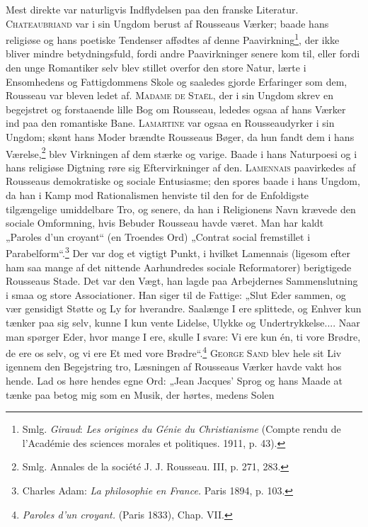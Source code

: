\documentclass[12pt,a4paper,openany]{book}
\newcommand{\opage}[1]{\marginnote{\footnotesize\textit{[#1]}}}
\begin{document}
Mest direkte var naturligvis Indflydelsen paa den franske
Literatur. \textsc{Chateaubriand} var i sin Ungdom berust af Rousseaus
Værker; baade hans religiøse og hans poetiske Tendenser
affødtes af denne Paavirkning\footnote[1]{Smlg. \emph{Giraud}: \textit{Les origines du Génie du Christianisme} (Compte rendu de l’Académie des sciences morales et politiques. 1911, p. 43).}, der ikke bliver mindre betydningsfuld,
fordi andre Paavirkninger senere kom til, eller fordi
den unge Romantiker selv blev stillet overfor den store Natur,
lærte i Ensomhedens og Fattigdommens Skole og saaledes gjorde
Erfaringer som dem, Rousseau var bleven ledet af. \textsc{Madame
de Staël}, der i sin Ungdom skrev en begejstret og forstaaende
lille Bog om Rousseau, lededes ogsaa af hans Værker ind paa
den romantiske Bane. \textsc{Lamartine} var ogsaa en Rousseaudyrker
i sin Ungdom; skønt hans Moder brændte Rousseaus Bøger, da
hun fandt dem i hans Værelse,\footnote[2]{Smlg. Annales de la société J. J. Rousseau. III, p. 271, 283.} blev Virkningen af dem stærke
og varige. Baade i hans Naturpoesi og i hans religiøse Digtning
røre sig Eftervirkninger af den. \textsc{Lamennais} paavirkedes af
Rousseaus demokratiske og sociale Entusiasme; den spores baade
i hans Ungdom, da han i Kamp mod Rationalismen henviste til
den for de Enfoldigste tilgængelige umiddelbare Tro, og senere,
da han i Religionens Navn krævede den sociale Omformning,
hvis Bebuder Rousseau havde været. Man har kaldt „Paroles
d’un croyant“ (en Troendes Ord) „Contrat social fremstillet i
Parabelform“.\footnote[3]{Charles Adam: \textit{La philosophie en France.} Paris 1894, p. 103.} Der var dog et vigtigt Punkt, i hvilket Lamennais
(ligesom efter ham saa mange af det nittende Aarhundredes
sociale Reformatorer) berigtigede Rousseaus Stade. Det var den
Vægt, han lagde paa Arbejdernes Sammenslutning i smaa og
store Associationer. Han siger til de Fattige: „Slut Eder sammen,
og vær gensidigt Støtte og Ly for hverandre. Saalænge I
ere splittede, og Enhver kun tænker paa sig selv, kunne I kun
vente Lidelse, Ulykke og Undertrykkelse.... Naar man spørger
Eder, hvor mange I ere, skulle I svare: Vi ere kun én, ti vore
Brødre, de ere os selv, og vi ere Et med vore Brødre“.\footnote[4]{\textit{Paroles d’un croyant.} (Paris 1833), Chap. VII.}
\setcounter{footnote}{0}%
\opage{123}\textsc{George Sand} blev hele sit Liv igennem den Begejstring tro,
Læsningen af Rousseaus Værker havde vakt hos hende. Lad
os høre hendes egne Ord: „Jean Jacques’ Sprog og hans Maade
at tænke paa betog mig som en Musik, der hørtes, medens Solen
\end{document}
